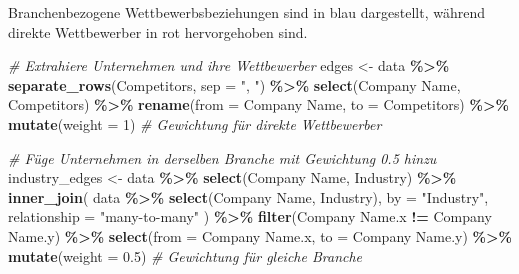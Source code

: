 \documentclass[
]{article}
\newenvironment{Shaded}{\begin{snugshade}}{\end{snugshade}}
\newcommand{\AttributeTok}[1]{\textcolor[rgb]{0.13,0.29,0.53}{#1}}
\newcommand{\CommentTok}[1]{\textcolor[rgb]{0.56,0.35,0.01}{\textit{#1}}}
\newcommand{\DecValTok}[1]{\textcolor[rgb]{0.00,0.00,0.81}{#1}}
\newcommand{\FloatTok}[1]{\textcolor[rgb]{0.00,0.00,0.81}{#1}}
\newcommand{\FunctionTok}[1]{\textcolor[rgb]{0.13,0.29,0.53}{\textbf{#1}}}
\newcommand{\NormalTok}[1]{#1}
\newcommand{\OtherTok}[1]{\textcolor[rgb]{0.56,0.35,0.01}{#1}}
\newcommand{\SpecialCharTok}[1]{\textcolor[rgb]{0.81,0.36,0.00}{\textbf{#1}}}
\newcommand{\StringTok}[1]{\textcolor[rgb]{0.31,0.60,0.02}{#1}}
\begin{document}
Branchenbezogene Wettbewerbsbeziehungen sind in blau dargestellt,
während direkte Wettbewerber in rot hervorgehoben sind.

\begin{Shaded}
\begin{Highlighting}[]
\CommentTok{\# Extrahiere Unternehmen und ihre Wettbewerber}
\NormalTok{edges }\OtherTok{\textless{}{-}}\NormalTok{ data }\SpecialCharTok{\%\textgreater{}\%}
  \FunctionTok{separate\_rows}\NormalTok{(Competitors, }\AttributeTok{sep =} \StringTok{", "}\NormalTok{) }\SpecialCharTok{\%\textgreater{}\%}
  \FunctionTok{select}\NormalTok{(}\StringTok{\textasciigrave{}}\AttributeTok{Company Name}\StringTok{\textasciigrave{}}\NormalTok{, Competitors) }\SpecialCharTok{\%\textgreater{}\%}
  \FunctionTok{rename}\NormalTok{(}\AttributeTok{from =} \StringTok{\textasciigrave{}}\AttributeTok{Company Name}\StringTok{\textasciigrave{}}\NormalTok{, }\AttributeTok{to =}\NormalTok{ Competitors) }\SpecialCharTok{\%\textgreater{}\%}
  \FunctionTok{mutate}\NormalTok{(}\AttributeTok{weight =} \DecValTok{1}\NormalTok{)  }\CommentTok{\# Gewichtung für direkte Wettbewerber}

\CommentTok{\# Füge Unternehmen in derselben Branche mit Gewichtung 0.5 hinzu}
\NormalTok{industry\_edges }\OtherTok{\textless{}{-}}\NormalTok{ data }\SpecialCharTok{\%\textgreater{}\%}
  \FunctionTok{select}\NormalTok{(}\StringTok{\textasciigrave{}}\AttributeTok{Company Name}\StringTok{\textasciigrave{}}\NormalTok{, Industry) }\SpecialCharTok{\%\textgreater{}\%}
  \FunctionTok{inner\_join}\NormalTok{(}
\NormalTok{    data }\SpecialCharTok{\%\textgreater{}\%} \FunctionTok{select}\NormalTok{(}\StringTok{\textasciigrave{}}\AttributeTok{Company Name}\StringTok{\textasciigrave{}}\NormalTok{, Industry),}
    \AttributeTok{by =} \StringTok{"Industry"}\NormalTok{,}
    \AttributeTok{relationship =} \StringTok{"many{-}to{-}many"}
\NormalTok{  ) }\SpecialCharTok{\%\textgreater{}\%}
  \FunctionTok{filter}\NormalTok{(}\StringTok{\textasciigrave{}}\AttributeTok{Company Name.x}\StringTok{\textasciigrave{}} \SpecialCharTok{!=} \StringTok{\textasciigrave{}}\AttributeTok{Company Name.y}\StringTok{\textasciigrave{}}\NormalTok{) }\SpecialCharTok{\%\textgreater{}\%}
  \FunctionTok{select}\NormalTok{(}\AttributeTok{from =} \StringTok{\textasciigrave{}}\AttributeTok{Company Name.x}\StringTok{\textasciigrave{}}\NormalTok{, }\AttributeTok{to =} \StringTok{\textasciigrave{}}\AttributeTok{Company Name.y}\StringTok{\textasciigrave{}}\NormalTok{) }\SpecialCharTok{\%\textgreater{}\%}
  \FunctionTok{mutate}\NormalTok{(}\AttributeTok{weight =} \FloatTok{0.5}\NormalTok{)  }\CommentTok{\# Gewichtung für gleiche Branche}


\end{Highlighting}
\end{Shaded}
\end{document}
